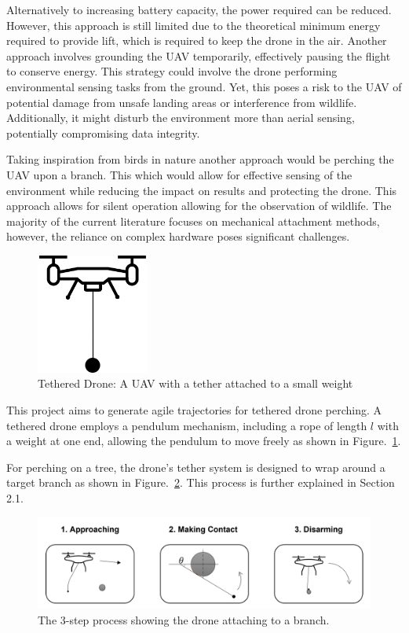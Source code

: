 Alternatively to increasing battery capacity, the power required can be reduced.
However, this approach is still limited due to the theoretical minimum energy required to provide lift, which is required to keep the drone in the air.
Another approach involves grounding the UAV temporarily, effectively pausing the flight to conserve energy.
This strategy could involve the drone performing environmental sensing tasks from the ground.
Yet, this poses a risk to the UAV of potential damage from unsafe landing areas or interference from wildlife.
Additionally, it might disturb the environment more than aerial sensing, potentially compromising data integrity.

Taking inspiration from birds in nature another approach would be perching the UAV upon a branch.
This which would allow for effective sensing of the environment while reducing the impact on results and protecting the drone.
This approach allows for silent operation allowing for the observation of wildlife.
The majority of the current literature focuses on mechanical attachment methods, however, the reliance on complex hardware poses significant challenges.

\begin{figure}[H]
  \centering
  \includegraphics[width=0.33\textwidth]{introduction/TetheredDrone.drawio.png}
  \caption{Tethered Drone: A UAV with a tether attached to a small weight}
\label{fig:intro-tethered-drone}
\end{figure}

This project aims to generate agile trajectories for tethered drone perching.
A tethered drone employs a pendulum mechanism, including a rope of length $l$ with a weight at one end, allowing the pendulum to move freely as shown in Figure.~\ref{fig:intro-tethered-drone}.

For perching on a tree, the drone's tether system is designed to wrap around a target branch as shown in Figure.~\ref{fig:intro-wrapping}.
This process is further explained in Section 2.1.

\begin{figure}[htbp]
  \centering
  \includegraphics[width=\textwidth]{introduction/dronePerching.png}
  \caption{The 3-step process showing the drone attaching to a branch.}
\label{fig:intro-wrapping}
\end{figure}

